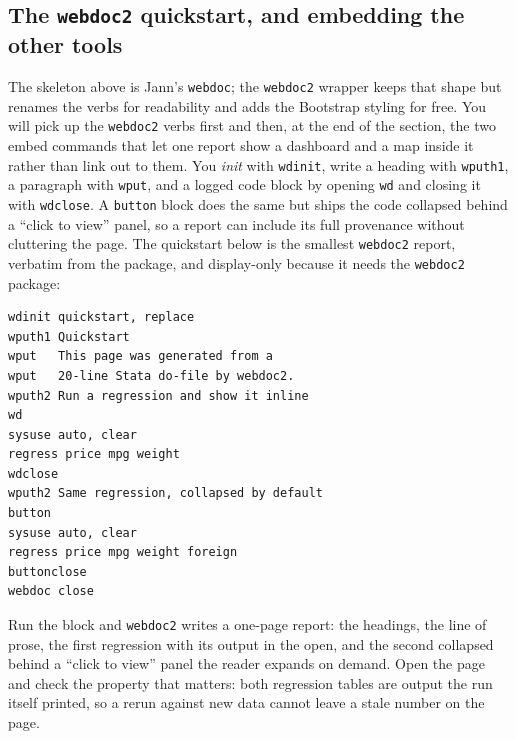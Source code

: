 \subsection{The \texttt{webdoc2} quickstart, and embedding the other tools}
The skeleton above is Jann's \texttt{webdoc}; the \texttt{webdoc2} wrapper keeps that shape but renames the verbs for readability and adds the Bootstrap styling for free. You will pick up the \texttt{webdoc2} verbs first and then, at the end of the section, the two embed commands that let one report show a dashboard and a map inside it rather than link out to them. You \emph{init} with \texttt{wdinit}, write a heading with \texttt{wputh1}, a paragraph with \texttt{wput}, and a logged code block by opening \texttt{wd} and closing it with \texttt{wdclose}. A \texttt{button} block does the same but ships the code collapsed behind a \enquote{click to view} panel, so a report can include its full provenance without cluttering the page. The quickstart below is the smallest \texttt{webdoc2} report, verbatim from the package, and display-only because it needs the \texttt{webdoc2} package:
\par
{\footnotesize
\begin{verbatim}
wdinit quickstart, replace
wputh1 Quickstart
wput   This page was generated from a
wput   20-line Stata do-file by webdoc2.
wputh2 Run a regression and show it inline
wd
sysuse auto, clear
regress price mpg weight
wdclose
wputh2 Same regression, collapsed by default
button
sysuse auto, clear
regress price mpg weight foreign
buttonclose
webdoc close
\end{verbatim}
}
Run the block and \texttt{webdoc2} writes a one-page report: the headings, the line of prose, the first regression with its output in the open, and the second collapsed behind a \enquote{click to view} panel the reader expands on demand. Open the page and check the property that matters: both regression tables are output the run itself printed, so a rerun against new data cannot leave a stale number on the page.

